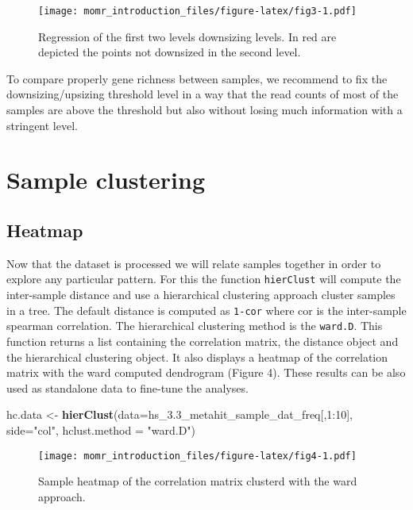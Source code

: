 \documentclass[]{article}
\newenvironment{Shaded}{\begin{snugshade}}{\end{snugshade}}
\newcommand{\KeywordTok}[1]{\textcolor[rgb]{0.13,0.29,0.53}{\textbf{{#1}}}}
\newcommand{\DataTypeTok}[1]{\textcolor[rgb]{0.13,0.29,0.53}{{#1}}}
\newcommand{\DecValTok}[1]{\textcolor[rgb]{0.00,0.00,0.81}{{#1}}}
\newcommand{\StringTok}[1]{\textcolor[rgb]{0.31,0.60,0.02}{{#1}}}
\newcommand{\NormalTok}[1]{{#1}}
\begin{document}
\begin{figure}[htbp]
\centering
\texttt{[image: momr\_introduction\_files/figure-latex/fig3-1.pdf]}
\caption{Regression of the first two levels downsizing levels. In red
are depicted the points not downsized in the second level.}
\end{figure}

To compare properly gene richness between samples, we recommend to fix
the downsizing/upsizing threshold level in a way that the read counts of
most of the samples are above the threshold but also without losing much
information with a stringent level.

\section{Sample clustering}\label{sample-clustering}

\subsection{Heatmap}\label{heatmap}

Now that the dataset is processed we will relate samples together in
order to explore any particular pattern. For this the function
\texttt{hierClust} will compute the inter-sample distance and use a
hierarchical clustering approach cluster samples in a tree. The default
distance is computed as \texttt{1-cor} where cor is the inter-sample
spearman correlation. The hierarchical clustering method is the
\texttt{ward.D}. This function returns a list containing the correlation
matrix, the distance object and the hierarchical clustering object. It
also displays a heatmap of the correlation matrix with the ward computed
dendrogram (Figure 4). These results can be also used as standalone data
to fine-tune the analyses.

\begin{Shaded}
\begin{Highlighting}[]
\NormalTok{hc.data <-}\StringTok{ }\KeywordTok{hierClust}\NormalTok{(}\DataTypeTok{data=}\NormalTok{hs_3.3_metahit_sample_dat_freq[,}\DecValTok{1}\NormalTok{:}\DecValTok{10}\NormalTok{], }\DataTypeTok{side=}\StringTok{"col"}\NormalTok{, }\DataTypeTok{hclust.method =} \StringTok{"ward.D"}\NormalTok{)}
\end{Highlighting}
\end{Shaded}

\begin{figure}[htbp]
\centering
\texttt{[image: momr\_introduction\_files/figure-latex/fig4-1.pdf]}
\caption{Sample heatmap of the correlation matrix clusterd with the ward
approach.}
\end{figure}
\end{document}
